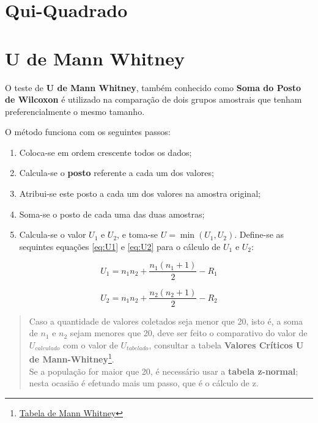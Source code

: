 \documentclass[
]{book}
\providecommand{\tightlist}{%
  \setlength{\itemsep}{0pt}\setlength{\parskip}{0pt}}
\begin{document}
\hypertarget{qui-quadrado}{%
\section{Qui-Quadrado}\label{qui-quadrado}}

\hypertarget{u-de-mann-whitney}{%
\section{U de Mann Whitney}\label{u-de-mann-whitney}}

O teste de \textbf{U de Mann Whitney}, também conhecido como \textbf{Soma do Posto de Wilcoxon} é utilizado na comparação de dois grupos amostrais que tenham preferencialmente o mesmo tamanho.

O método funciona com os seguintes passos:

\begin{enumerate}
\def\labelenumi{\arabic{enumi}.}
\tightlist
\item
  Coloca-se em ordem crescente todos os dados;
\item
  Calcula-se o \textbf{posto} referente a cada um dos valores;
\item
  Atribui-se este posto a cada um dos valores na amostra original;
\item
  Soma-se o posto de cada uma das duas amostras;
\item
  Calcula-se o valor \(U_1\) e \(U_2\), e toma-se \(U = \min(U_1,U_2)\). Define-se as sequintes equações \eqref{eq:U1} e \eqref{eq:U2} para o cálculo de \(U_1\) e \(U_2\):
\end{enumerate}

\begin{equation}
  U_1 = n_1 n_2 + \frac{n_1(n_1+1)}{2} - R_1 
  \label{eq:U1}
\end{equation}

\begin{equation}
U_2 = n_1 n_2 + \frac{n_2(n_2+1)}{2} - R_2
\label{eq:U2}
\end{equation}

\begin{quote}
Caso a quantidade de valores coletados seja menor que 20, isto é, a soma de \(n_1\) e \(n_2\) sejam menores que 20, deve ser feito o comparativo do valor de \(U_{calculado}\) com o valor de \(U_{tabelado}\), consultar a tabela \textbf{Valores Críticos U de Mann-Whitney}\footnote{\href{https://ocw.umb.edu/psychology/psych-270/other-materials/RelativeResourceManager.pdf}{Tabela de Mann Whitney}}.\\
Se a população for maior que 20, é necessário usar a \textbf{tabela z-normal}; nesta ocasião é efetuado mais um passo, que é o cálculo de z.
\end{quote}
\end{document}
